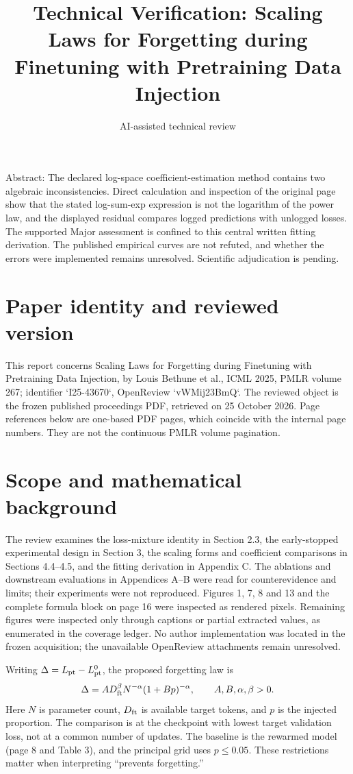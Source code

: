 \documentclass[10pt]{article}
\title{Technical Verification: Scaling Laws for Forgetting during Finetuning with Pretraining Data Injection}
\author{AI-assisted technical review}
\date{}
\begin{document}
\maketitle
Abstract: The declared log-space coefficient-estimation method contains two algebraic inconsistencies. Direct calculation and inspection of the original page show that the stated log-sum-exp expression is not the logarithm of the power law, and the displayed residual compares logged predictions with unlogged losses. The supported Major assessment is confined to this central written fitting derivation. The published empirical curves are not refuted, and whether the errors were implemented remains unresolved. Scientific adjudication is pending.\par
\section*{Paper identity and reviewed version}
This report concerns Scaling Laws for Forgetting during Finetuning with Pretraining Data Injection, by Louis Bethune et al., ICML 2025, PMLR volume 267; identifier `I25-43670`, OpenReview `vWMij23BmQ`. The reviewed object is the frozen published proceedings PDF, retrieved on 25 October 2026. Page references below are one-based PDF pages, which coincide with the internal page numbers. They are not the continuous PMLR volume pagination.\par
\section*{Scope and mathematical background}
The review examines the loss-mixture identity in Section 2.3, the early-stopped experimental design in Section 3, the scaling forms and coefficient comparisons in Sections 4.4–4.5, and the fitting derivation in Appendix C. The ablations and downstream evaluations in Appendices A–B were read for counterevidence and limits; their experiments were not reproduced. Figures 1, 7, 8 and 13 and the complete formula block on page 16 were inspected as rendered pixels. Remaining figures were inspected only through captions or partial extracted values, as enumerated in the coverage ledger. No author implementation was located in the frozen acquisition; the unavailable OpenReview attachments remain unresolved.\par
Writing \(\Delta=L_{\rm pt}-L^0_{\rm pt}\), the proposed forgetting law is \[\Delta=A D_{\rm ft}^{\beta}N^{-\alpha}(1+Bp)^{-\alpha},\qquad A,B,\alpha,\beta>0.\] Here \(N\) is parameter count, \(D_{\rm ft}\) is available target tokens, and \(p\) is the injected proportion. The comparison is at the checkpoint with lowest target validation loss, not at a common number of updates. The baseline is the rewarmed model (page 8 and Table 3), and the principal grid uses \(p\leq0.05\). These restrictions matter when interpreting “prevents forgetting.”\par
\end{document}
